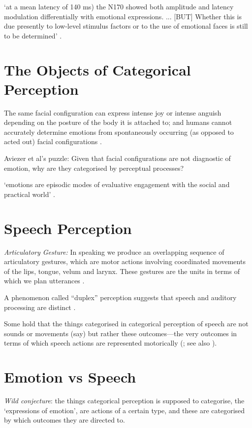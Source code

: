 \documentclass[12pt]{extarticle}
\begin{document}
\begin{multicols*}{3}
‘at a mean latency of 140 ms) the N170 showed both amplitude and latency
modulation differentially with emotional expressions. ...
[BUT] Whether this is due presently to low-level stimulus factors or to the use of emotional faces
is still to be determined’ \citep[p.~616]{batty:2003_early}.



\section{The Objects of Categorical Perception}

The same facial configuration can express intense joy or intense anguish depending on the posture of
the body it is attached to; and humans cannot accurately determine emotions from
spontaneously occurring (as opposed to acted out) facial
configurations \citep{motley:1988_facial,aviezer:2008_angry,aviezer:2012_body}.

Aviezer et al's puzzle:
Given that  facial configurations are not diagnostic of emotion, why  are they categorised by perceptual processes?

‘emotions are episodic modes of evaluative engagement with the social and practical world’
\citep[p.\ 1512]{parkinson:2008_emotions}.


\section{Speech Perception}

\emph{Articulatory Gesture:}
In speaking we produce an overlapping sequence of articulatory gestures, which are motor actions
involving coordinated movements of the lips, tongue, velum and larynx. These gestures are the units
in terms of which we plan utterances \citep{Browman:1992da,Goldstein:2003bn}.

A
phenomenon called “duplex” perception suggests that speech and auditory processing are distinct \citep{Liberman:1981xk}.

Some hold that the things categorised in categorical perception of speech are not sounds or movements (say) but rather these outcomes---the very outcomes in terms of which speech actions are represented motorically (\citealp{Liberman:2000gr}; see also \citealp{Browman:1992da}).
 

\section{Emotion vs Speech}
\emph{Wild conjecture}: 
the things categorical perception is supposed to categorise, the ‘expressions of emotion’, are actions of a certain type, and these are categorised by which outcomes they are directed to.


\end{multicols*}
\end{document}
